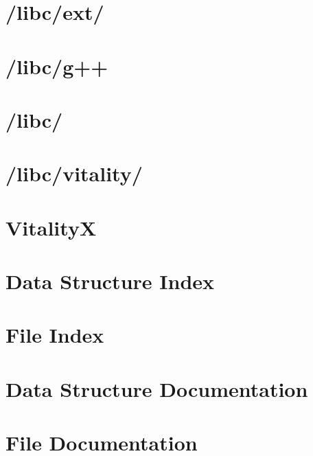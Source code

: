\documentclass[twoside]{book}
\newcommand{\+}{\discretionary{\mbox{\scriptsize$\hookleftarrow$}}{}{}}
\newcommand{\clearemptydoublepage}{%
  \newpage{\pagestyle{empty}\cleardoublepage}%
}
\begin{document}
\chapter{/libc/ext/}
\label{a00203}

\chapter{/libc/g++}
\label{a00204}

\chapter{/libc/}
\label{a00205}

\chapter{/libc/vitality/}
\label{a00206}

\chapter{VitalityX}
\label{a00207}

\chapter{Data Structure Index}

\chapter{File Index}

\chapter{Data Structure Documentation}














\chapter{File Documentation}























































\backmatter
\newpage
{}
\clearemptydoublepage
{}
\printindex
\end{document}
